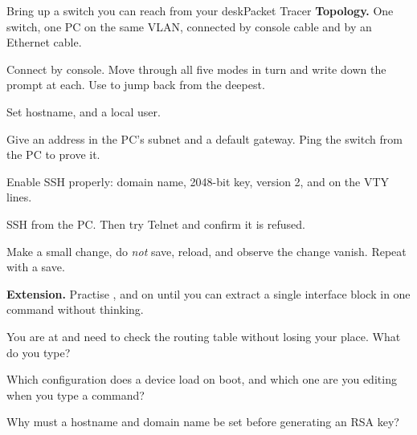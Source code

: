 \begin{lab}{Bring up a switch you can reach from your desk}{Packet Tracer}
\textbf{Topology.} One switch, one PC on the same VLAN, connected by console
cable and by an Ethernet cable.

\begin{tasks}
  \item Connect by console. Move through all five modes in turn and write down
        the prompt at each. Use  to jump back from the deepest.
  \item Set hostname,  and a local user.
  \item Give  an address in the PC's subnet and a default gateway.
        Ping the switch from the PC to prove it.
  \item Enable SSH properly: domain name, 2048-bit key, version 2, and
         on the VTY lines.
  \item SSH from the PC. Then try Telnet and confirm it is refused.
  \item Make a small change, do \emph{not} save, reload, and observe the change
        vanish. Repeat with a save.
  \item \textbf{Extension.} Practise ,  and
         on  until you can extract a single
        interface block in one command without thinking.
\end{tasks}
\end{lab}

\begin{checkpoint}
\begin{tightnum}
  \item You are at  and need to check the routing table
        without losing your place. What do you type?
  \item Which configuration does a device load on boot, and which one are you
        editing when you type a command?
  \item Why must a hostname and domain name be set before generating an RSA key?
\end{tightnum}
\end{checkpoint}

